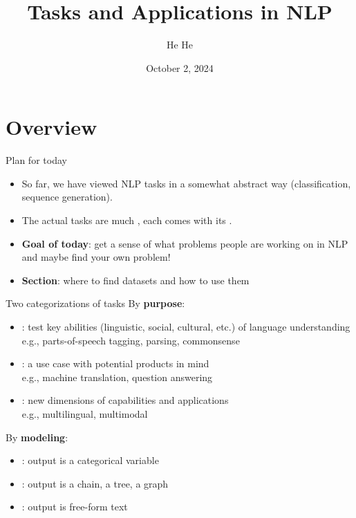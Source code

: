 \documentclass[usenames,dvipsnames,notes,11pt,aspectratio=169,hyperref={colorlinks=true, linkcolor=blue}]{beamer}
\title[DS-GA.1011]{Tasks and Applications in NLP}
\author[He He]{He He
}
\institute[NYU]{
    \texttt{[image: ../figures/nyu-logo]}\\
}
\date{October 2, 2024}
\begin{document}
\begin{frame}
\titlepage
\end{frame}

\section{Overview}

\begin{frame}
    {Plan for today}
    \begin{itemize}
        \itemsep1em
        \item So far, we have viewed NLP tasks in a somewhat abstract way (classification, sequence generation).
        \item The actual tasks are much , each comes with its .
        \item \textbf{Goal of today}: get a sense of what problems people are working on in NLP and maybe find your own problem!
        \item \textbf{Section}: where to find datasets and how to use them 
    \end{itemize}
\end{frame}

\begin{frame}
    {Two categorizations of tasks}
    By \textbf{purpose}:\\
    \begin{itemize}
        \item {}: test key abilities (linguistic, social, cultural, etc.) of language understanding\\
            e.g., parts-of-speech tagging, parsing, commonsense
        \item {}: a use case with potential products in mind\\
            e.g., machine translation, question answering
        \item {}: new dimensions of capabilities and applications\\
            e.g., multilingual, multimodal
    \end{itemize}

    \pause
    \medskip
    By \textbf{modeling}:\\
    \begin{itemize}
        \item {}: output is a categorical variable
        \item {}: output is a chain, a tree, a graph
        \item {}: output is free-form text 
    \end{itemize}
\end{frame}
\end{document}
